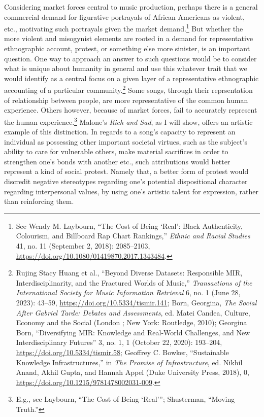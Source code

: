 \documentclass[phdthesis,12pt,final]{wuthesis}
\theoremstyle{definition}
\theoremstyle{definition}
\theoremstyle{definition}
\theoremstyle{definition}
\theoremstyle{remark}
\begin{document}
Considering market forces central to music production, perhaps there is a general commercial demand for figurative portrayals of African Americans as violent, etc., motivating such portrayals given the market demand.\footnote{See Wendy M. Laybourn, {``The Cost of Being {`Real'}: Black Authenticity, Colourism, and {Billboard Rap Chart} Rankings,''} \emph{Ethnic and Racial Studies} 41, no. 11 (September 2, 2018): 2085--2103, \url{https://doi.org/10.1080/01419870.2017.1343484}.} But whether the more violent and misogynist elements are rooted in a demand for representative ethnographic account, protest, or something else more sinister, is an important question. One way to approach an answer to such questions would be to consider what is unique about humanity in general and use this whatever trait that we would identify as a central focus on a given layer of a representative ethnographic accounting of a particular community.\footnote{Rujing Stacy Huang et al., {``Beyond {Diverse Datasets}: {Responsible MIR}, {Interdisciplinarity}, and the {Fractured Worlds} of {Music},''} \emph{Transactions of the International Society for Music Information Retrieval} 6, no. 1 (June 28, 2023): 43--59, \url{https://doi.org/10.5334/tismir.141}; Born, Georgina, \emph{The Social After {Gabriel Tarde}: Debates and Assessments}, ed. Matei Candea, Culture, Economy and the Social (London ; New York: Routledge, 2010); Georgina Born, {``Diversifying {MIR}: {Knowledge} and {Real-World Challenges}, and {New Interdisciplinary Futures}''} 3, no. 1, 1 (October 22, 2020): 193--204, \url{https://doi.org/10.5334/tismir.58}; Geoffrey C. Bowker, {``Sustainable {Knowledge Infrastructures},''} in \emph{The {Promise} of {Infrastructure}}, ed. Nikhil Anand, Akhil Gupta, and Hannah Appel (Duke University Press, 2018), 0, \url{https://doi.org/10.1215/9781478002031-009}.} Some songs, through their reprsentation of relationship between people, are more representative of the common human experience. Others however, because of market forces, fail to accurately represent the human experience.\footnote{E.g., see Laybourn, {``The Cost of Being {`Real'}''}; Shusterman, {``Moving {Truth}.''}} Malone's \emph{Rich and Sad}, as I will show, offers an artistic example of this distinction. In regards to a song's capacity to represent an individual as possessing other important societal virtues, such as the subject's ability to care for vulnerable others, make material sacrifices in order to strengthen one's bonds with another etc., such attributions would better represent a kind of social protest. Namely that, a better form of protest would discredit negative stereotypes regarding one's potential dispositional character regarding interpersonal values, by using one's artistic talent for expression, rather than reinforcing them.
\end{document}
